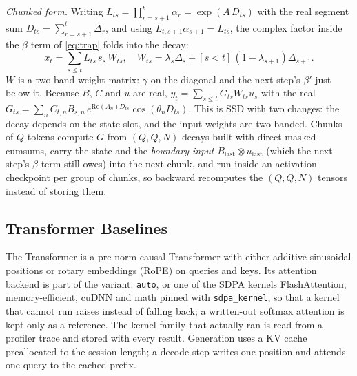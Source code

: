 \documentclass[conference]{IEEEtran}
\begin{document}
\emph{Chunked form.} Writing
$L_{ts}=\prod_{r=s+1}^{t}\alpha_r=\exp(A\,D_{ts})$ with the real segment sum
$D_{ts}=\sum_{r=s+1}^{t}\Delta_r$, and using $L_{t,s+1}\alpha_{s+1}=L_{ts}$, the
complex factor inside the $\beta$ term of \eqref{eq:trap} folds into the decay:
\begin{equation}
x_t=\sum_{s\le t} L_{ts}\, s_s\, W_{ts},\quad
W_{ts}=\lambda_s\Delta_s+[s<t]\,(1-\lambda_{s+1})\Delta_{s+1}.
\label{eq:twoband}
\end{equation}
$W$ is a two-band weight matrix: $\gamma$ on the diagonal and the next step's
$\beta'$ just below it. Because $B$, $C$ and $u$ are real,
$y_t=\sum_{s\le t}G_{ts}W_{ts}u_s$ with the real
$G_{ts}=\sum_n C_{t,n}B_{s,n}\,e^{\mathrm{Re}(A_n)D_{ts}}\cos(\theta_n D_{ts})$.
This is SSD with two changes: the decay depends on the state slot, and the
input weights are two-banded. Chunks of $Q$ tokens compute $G$ from
$(Q,Q,N)$ decays built with direct masked cumsums, carry the state and the
\emph{boundary input} $B_{\mathrm{last}}\otimes u_{\mathrm{last}}$ (which the
next step's $\beta$ term still owes) into the next chunk, and run inside an
activation checkpoint per group of chunks, so backward recomputes the
$(Q,Q,N)$ tensors instead of storing them.

\subsection{Transformer Baselines}
The Transformer is a pre-norm causal Transformer with either additive
sinusoidal positions or rotary embeddings (RoPE) \cite{su2024roformer} on queries and keys. Its
attention backend is part of the variant: \texttt{auto}, or one of the SDPA
kernels FlashAttention, memory-efficient, cuDNN and math pinned with
\texttt{sdpa\_kernel}, so that a kernel that cannot run raises instead of
falling back; a written-out softmax attention is kept only as a reference.
The kernel family that actually ran is read from a profiler trace and stored
with every result. Generation uses a KV cache preallocated to the session
length; a decode step writes one position and attends one query to the cached
prefix.
\end{document}
